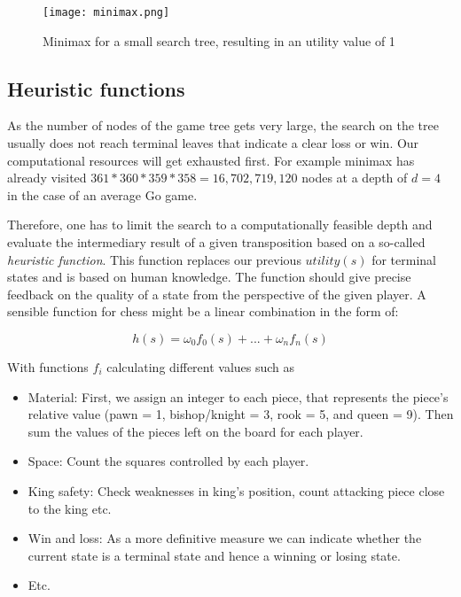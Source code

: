 \begin{figure}
    \centering
    \texttt{[image: minimax.png]}
    \caption{Minimax for a small search tree, resulting in an utility value of 1}
    \label{minimax}
\end{figure}

\subsection{Heuristic functions}
As the number of nodes of the game tree gets very large, the search on the tree usually does not reach terminal leaves that indicate a clear loss or win. Our computational resources will get exhausted first. For example minimax has already visited $ 361 * 360 * 359 * 358 = 16,702,719,120 $ nodes at a depth of $ d = 4 $ in the case of an average Go game.

Therefore, one has to limit the search to a computationally feasible depth and evaluate the intermediary result of a given transposition based on a so-called \textit{heuristic function}. This function replaces our previous $ utility(s) $ for terminal states and is based on human knowledge. The function should give precise feedback on the quality of a state from the perspective of the given player. A sensible function for chess might be a linear combination in the form of:

\begin{equation}
    h(s) = \omega_0f_0(s) + ... + \omega_nf_n(s)
\end{equation}

With functions $ f_i $ calculating different values such as

\begin{itemize}
    \item Material: First, we assign an integer to each piece, that represents the piece's relative value (pawn = 1, bishop/knight = 3, rook = 5, and queen = 9). Then sum the values of the pieces left on the board for each player.
    \item Space: Count the squares controlled by each player.
    \item King safety: Check weaknesses in king's position, count attacking piece close to the king etc.
    \item Win and loss: As a more definitive measure we can indicate whether the current state is a terminal state and hence a winning or losing state.
    \item Etc.
\end{itemize}


